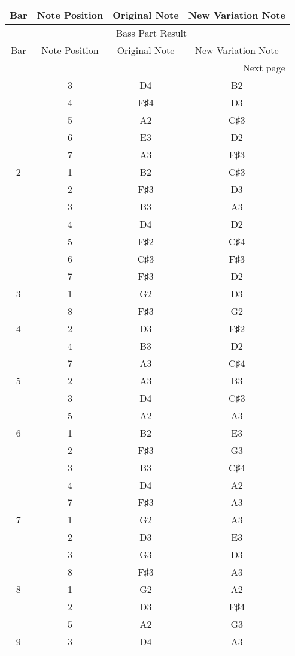 \documentclass{article}
\begin{document}
\begin{longtable}{|c|c|c|c|}
\hline
Bar & Note Position & Original Note & New Variation Note \\ \hline
\endfirsthead
\multicolumn{4}{c}{{\tablename\ \thetable{} Bass Part Result}} \\
\hline
Bar & Note Position & Original Note & New Variation Note \\ \hline
\hline
\endhead
\hline
\multicolumn{4}{r}{Next page}\endfoot
\hline
\endlastfoot
1 & 1 & D3 & B2 \\ 
  & 3 & D4 & B2 \\ 
  & 4 & F♯4 & D3 \\ 
  & 5 & A2 & C♯3 \\ 
  & 6 & E3 & D2 \\ 
  & 7 & A3 & F♯3 \\ 
\hline
2 & 1 & B2 & C♯3 \\ 
  & 2 & F♯3 & D3 \\ 
  & 3 & B3 & A3 \\ 
  & 4 & D4 & D2 \\ 
  & 5 & F♯2 & C♯4 \\ 
  & 6 & C♯3 & F♯3 \\ 
  & 7 & F♯3 & D2 \\ 
\hline
3 & 1 & G2 & D3 \\ 
  & 8 & F♯3 & G2 \\ 
\hline
4 & 2 & D3 & F♯2 \\ 
  & 4 & B3 & D2 \\ 
  & 7 & A3 & C♯4 \\ 
\hline
5 & 2 & A3 & B3 \\ 
  & 3 & D4 & C♯3 \\ 
  & 5 & A2 & A3 \\ 
\hline
6 & 1 & B2 & E3 \\ 
  & 2 & F♯3 & G3 \\ 
  & 3 & B3 & C♯4 \\ 
  & 4 & D4 & A2 \\ 
  & 7 & F♯3 & A3 \\ 
\hline
7 & 1 & G2 & A3 \\ 
  & 2 & D3 & E3 \\ 
  & 3 & G3 & D3 \\ 
  & 8 & F♯3 & A3 \\ 
\hline
8 & 1 & G2 & A2 \\ 
  & 2 & D3 & F♯4 \\ 
  & 5 & A2 & G3 \\ 
\hline
9 & 3 & D4 & A3 \\ 

\end{longtable}
\end{document}
